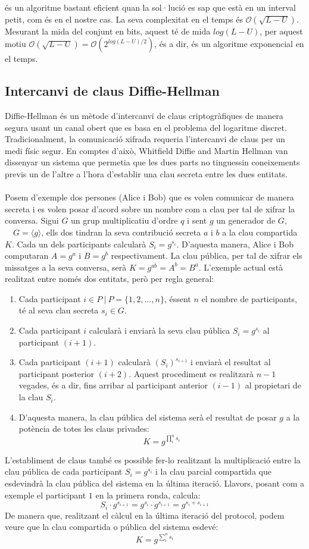 \documentclass{article}
\begin{document}
\cite{kangaroo} és un algoritme bastant eficient quan la sol·lució es sap que està en un interval petit, com és en el nostre cas. La seva complexitat en el temps és $\mathcal{O}(\sqrt{L - U})$. Mesurant la mida del conjunt en bits, aquest té de mida $log(L - U)$, per aquest motiu $\mathcal{O}(\sqrt{L - U}) =  \mathcal{O}(2^{log(L - U) / 2})$, és a dir, és un algoritme exponencial en el temps.
\subsection{Intercanvi de claus Diffie-Hellman}\label{sec:diffie-hellman}
Diffie-Hellman \cite{diffie-hellman} és un mètode d'intercanvi de claus criptogràfiques de manera segura usant un canal obert que es basa en el problema del logaritme discret. Tradicionalment, la comunicació xifrada requeria l'intercanvi de claus per un medi físic segur. En comptes d'això,  Whitfield Diffie and Martin Hellman van dissenyar un sistema que permetia que les dues parts no tinguessin coneixements previs un de l'altre a l'hora d'establir una clau secreta entre les dues entitats.
\\
\\
Posem d'exemple dos persones (Alice i Bob) que es volen comunicar de manera secreta i es volen posar d'acord sobre un nombre com a clau per tal de xifrar la conversa. Sigui $G$ un grup multiplicatiu d'ordre $q$ i sent $g$ un generador de $G$, $\quad G = \langle g \rangle$, ells dos tindran la seva contribució secreta $a$ i $b$ a la clau compartida $K$. Cada un dels participants calcularà $S_i = g^{s_i} $. D'aquesta manera, Alice i Bob computaran $A = g^a$ i $B = g^b$ respectivament. La clau pública, per tal de xifrar els missatges a la seva conversa, serà $ K = g^{ab} = A^b = B^a $. L'exemple actual està realitzat entre només dos entitats, però per regla general:
\begin{enumerate}
	\item Cada participant $i \in P \ | \ P = \{1, 2, \dots, n\}$, éssent $n$ el nombre de participants, té al seva clau secreta $s_i \in G$.
	\item Cada participant $i$ calcularà i enviarà la seva clau pública $S_i = g^{s_i}$ al participant $(i+1)$.
	\item Cada participant $(i + 1)$ calcularà $(S_{i})^{s_{i + 1}}$ i enviarà el resultat al participant posterior $(i + 2)$. Aquest procediment es realitzarà $n -1$ vegades, és a dir, fins arribar al participant anterior $(i -1)$ al propietari de la clau $S_i$.
	\item D'aquesta manera, la clau pública del sistema serà el resultat de posar $g$ a la potència de totes les claus privades:
	\[K = g^{\prod_{i}^{n} s_i}\]
\end{enumerate}
L'establiment de claus també es possible fer-lo realitzant la multiplicació entre la clau pública de cada participant $S_i = g^{s_i}$ i la clau parcial compartida que esdevindrà la clau pública del sistema en la última iteració. Llavors, posant com a exemple el participant $1$ en la primera ronda, calcula:
\[S_i \cdot g^{s_{i + 1}} = g^{s_i} \cdot g^{s_{i+1}} = g^{s_i + s_{i+1}}\]
De manera que, realitzant el càlcul en la última iteració del protocol, podem veure que la clau compartida o pública del sistema esdevé:
\[K = g^{\sum_{i}^{n} s_i}\]
\end{document}
